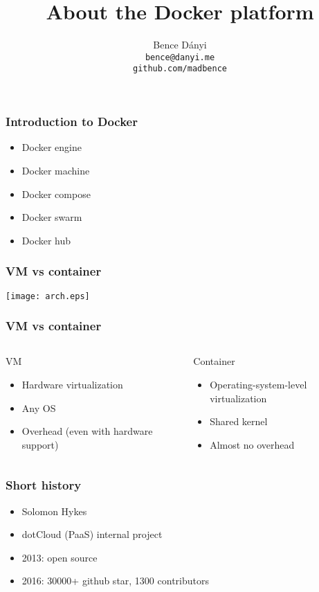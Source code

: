 \documentclass[xetex,mathserif,serif]{beamer}
\title{About the Docker platform}
\author{Bence Dányi\\\vspace{1cm}\tiny{\texttt{bence@danyi.me\\github.com/madbence}}}
\begin{document}
  \frame{\titlepage}
  \begin{frame}
    \frametitle{Introduction to Docker}
    \begin{itemize}
      \item Docker engine
      \item Docker machine
      \item Docker compose
      \item Docker swarm
      \item Docker hub
    \end{itemize}
  \end{frame}
  \begin{frame}
    \frametitle{VM vs container}
    \texttt{[image: arch.eps]}
  \end{frame}
  \begin{frame}
    \frametitle{VM vs container}
    \begin{columns}
      \begin{column}{0.5\textwidth}
        VM
        \begin{itemize}
          \item Hardware virtualization
          \item Any OS
          \item Overhead (even with hardware support)
        \end{itemize}
      \end{column}
      \begin{column}{0.5\textwidth}
        Container
        \begin{itemize}
          \item Operating-system-level virtualization
          \item Shared kernel
          \item Almost no overhead
        \end{itemize}
      \end{column}
    \end{columns}
  \end{frame}
  \begin{frame}
    \frametitle{Short history}
    \begin{itemize}
      \item Solomon Hykes
      \item dotCloud (PaaS) internal project
      \item 2013: open source
      \item 2016: 30000+ github star, 1300 contributors
    \end{itemize}
  \end{frame}
\end{document}
